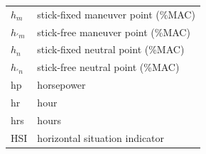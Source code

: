 \documentclass[
]{book}
\begin{document}
\begin{longtable}[]{@{}ll@{}}
\begin{minipage}[t]{0.47\columnwidth}
\(h_m\)\strut
\end{minipage} & \begin{minipage}[t]{0.47\columnwidth}\raggedright
stick-fixed maneuver point (\%MAC)\strut
\end{minipage}\tabularnewline
\begin{minipage}[t]{0.47\columnwidth}\raggedright
\(h_{'m}\)\strut
\end{minipage} & \begin{minipage}[t]{0.47\columnwidth}\raggedright
stick-free maneuver point (\%MAC)\strut
\end{minipage}\tabularnewline
\begin{minipage}[t]{0.47\columnwidth}\raggedright
\(h_n\)\strut
\end{minipage} & \begin{minipage}[t]{0.47\columnwidth}\raggedright
stick-fixed neutral point (\%MAC)\strut
\end{minipage}\tabularnewline
\begin{minipage}[t]{0.47\columnwidth}\raggedright
\(h_{'n}\)\strut
\end{minipage} & \begin{minipage}[t]{0.47\columnwidth}\raggedright
stick-free neutral point (\%MAC)\strut
\end{minipage}\tabularnewline
\begin{minipage}[t]{0.47\columnwidth}\raggedright
hp\strut
\end{minipage} & \begin{minipage}[t]{0.47\columnwidth}\raggedright
horsepower\strut
\end{minipage}\tabularnewline
\begin{minipage}[t]{0.47\columnwidth}\raggedright
hr\strut
\end{minipage} & \begin{minipage}[t]{0.47\columnwidth}\raggedright
hour\strut
\end{minipage}\tabularnewline
\begin{minipage}[t]{0.47\columnwidth}\raggedright
hrs\strut
\end{minipage} & \begin{minipage}[t]{0.47\columnwidth}\raggedright
hours\strut
\end{minipage}\tabularnewline
\begin{minipage}[t]{0.47\columnwidth}\raggedright
HSI\strut
\end{minipage} & \begin{minipage}[t]{0.47\columnwidth}\raggedright
horizontal situation indicator\strut

\end{minipage}
\end{longtable}
\end{document}
